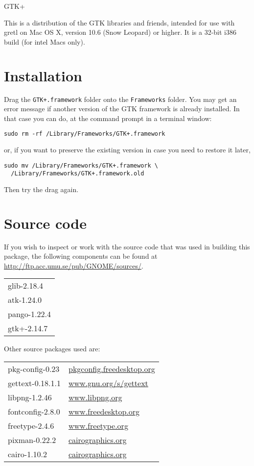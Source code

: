 \documentclass[11pt]{article}
\begin{document}
\thispagestyle{empty}

\begin{center}
{\color{gold} \gtkfont GTK+}
\end{center}

This is a distribution of the GTK libraries and friends, intended for
use with gretl on Mac OS X, version 10.6 (Snow Leopard) or higher.
It is a 32-bit i386 build (for intel Macs only).

\section{Installation}

Drag the \texttt{GTK+.framework} folder onto the \texttt{Frameworks}
folder. You may get an error message if another version of the GTK
framework is already installed. In that case you can do, at the
command prompt in a terminal window:

\verb|sudo rm -rf /Library/Frameworks/GTK+.framework|

or, if you want to preserve the existing version in case you need to
restore it later,
\begin{verbatim}
sudo mv /Library/Frameworks/GTK+.framework \
  /Library/Frameworks/GTK+.framework.old
\end{verbatim}

Then try the drag again.

\section{Source code}

If you wish to inspect or work with the source code that was used in
building this package, the following components can be found at
\url{http://ftp.acc.umu.se/pub/GNOME/sources/}.

\begin{tabular}{l}
glib-2.18.4 \\
atk-1.24.0 \\
pango-1.22.4 \\
gtk+-2.14.7 \\
\end{tabular}

Other source packages used are:

\begin{tabular}{ll}
pkg-config-0.23 & \url{pkgconfig.freedesktop.org} \\
gettext-0.18.1.1 & \url{www.gnu.org/s/gettext} \\
libpng-1.2.46 & \url{www.libpng.org} \\
fontconfig-2.8.0 & \url{www.freedesktop.org} \\
freetype-2.4.6 & \url{www.freetype.org} \\
pixman-0.22.2 & \url{cairographics.org} \\
cairo-1.10.2 & \url{cairographics.org} \\
\end{tabular}
\end{document}
